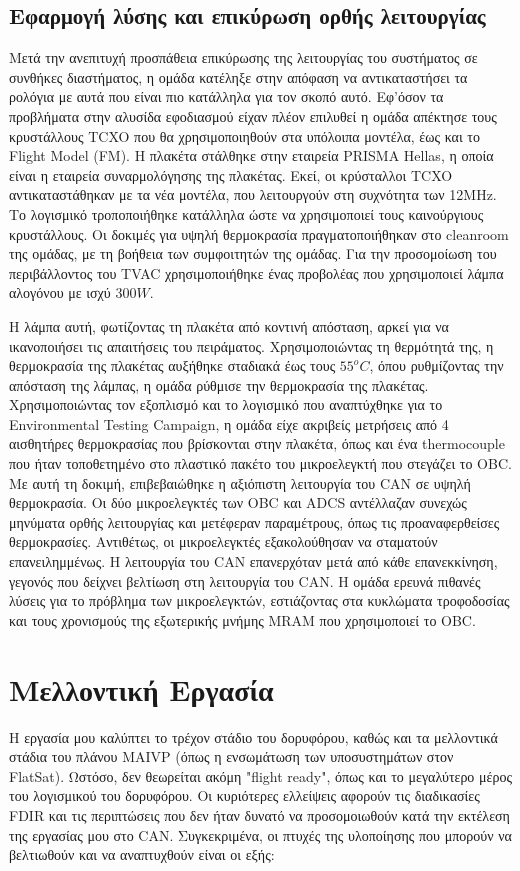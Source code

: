 \documentclass[a4paper,nobib,justified]{tufte-book}
\begin{document}
	\subsection{Εφαρμογή λύσης και επικύρωση ορθής λειτουργίας}
	Μετά την ανεπιτυχή προσπάθεια επικύρωσης της λειτουργίας του συστήματος σε συνθήκες διαστήματος, η ομάδα κατέληξε στην απόφαση να αντικαταστήσει τα ρολόγια με αυτά που είναι πιο κατάλληλα για τον σκοπό αυτό. Εφ'όσον τα προβλήματα στην αλυσίδα εφοδιασμού είχαν πλέον επιλυθεί η ομάδα απέκτησε τους κρυστάλλους TCXO που θα χρησιμοποιηθούν στα υπόλοιπα μοντέλα, έως και το Flight Model (FM). Η πλακέτα στάλθηκε στην εταιρεία PRISMA Hellas, η οποία είναι η εταιρεία συναρμολόγησης της πλακέτας. Εκεί, οι κρύσταλλοι TCXO αντικαταστάθηκαν με τα νέα μοντέλα, που λειτουργούν στη συχνότητα των 12MHz. Το λογισμικό τροποποιήθηκε κατάλληλα ώστε να χρησιμοποιεί τους καινούργιους κρυστάλλους. Οι δοκιμές για υψηλή θερμοκρασία πραγματοποιήθηκαν στο cleanroom της ομάδας, με τη βοήθεια των συμφοιτητών της ομάδας. Για την προσομοίωση του περιβάλλοντος του TVAC χρησιμοποιήθηκε ένας προβολέας που χρησιμοποιεί λάμπα αλογόνου με ισχύ $300W$.
	
	\par Η λάμπα αυτή, φωτίζοντας τη πλακέτα από κοντινή απόσταση, αρκεί για να ικανοποιήσει τις απαιτήσεις του πειράματος. Χρησιμοποιώντας τη θερμότητά της, η θερμοκρασία της πλακέτας αυξήθηκε σταδιακά έως τους $55^o C$, όπου ρυθμίζοντας την απόσταση της λάμπας, η ομάδα ρύθμισε την θερμοκρασία της πλακέτας. Χρησιμοποιώντας τον εξοπλισμό και το λογισμικό που αναπτύχθηκε για το Environmental Testing Campaign, η ομάδα είχε ακριβείς μετρήσεις από 4 αισθητήρες θερμοκρασίας που βρίσκονται στην πλακέτα, όπως και ένα thermocouple που ήταν τοποθετημένο στο πλαστικό πακέτο του μικροελεγκτή που στεγάζει το OBC. Με αυτή τη δοκιμή, επιβεβαιώθηκε η αξιόπιστη λειτουργία του CAN σε υψηλή θερμοκρασία. Οι δύο μικροελεγκτές των OBC και ADCS αντέλλαζαν συνεχώς μηνύματα ορθής λειτουργίας και μετέφεραν παραμέτρους, όπως τις προαναφερθείσες θερμοκρασίες. Αντιθέτως, οι μικροελεγκτές εξακολούθησαν να σταματούν επανειλημμένως. Η λειτουργία του CAN επανερχόταν μετά από κάθε επανεκκίνηση, γεγονός που δείχνει βελτίωση στη λειτουργία του CAN. Η ομάδα ερευνά πιθανές λύσεις για το πρόβλημα των μικροελεγκτών, εστιάζοντας στα κυκλώματα τροφοδοσίας και τους χρονισμούς της εξωτερικής μνήμης MRAM που χρησιμοποιεί το OBC.

\section{Μελλοντική Εργασία}
Η εργασία μου καλύπτει το τρέχον στάδιο του δορυφόρου, καθώς και τα μελλοντικά στάδια του πλάνου MAIVP (όπως η ενσωμάτωση των υποσυστημάτων στον FlatSat). Ωστόσο, δεν θεωρείται ακόμη "flight ready", όπως και το μεγαλύτερο μέρος του λογισμικού του δορυφόρου. Οι κυριότερες ελλείψεις αφορούν τις διαδικασίες FDIR και τις περιπτώσεις που δεν ήταν δυνατό να προσομοιωθούν κατά την εκτέλεση της εργασίας μου στο CAN. Συγκεκριμένα, οι πτυχές της υλοποίησης που μπορούν να βελτιωθούν και να αναπτυχθούν είναι οι εξής:
\end{document}
